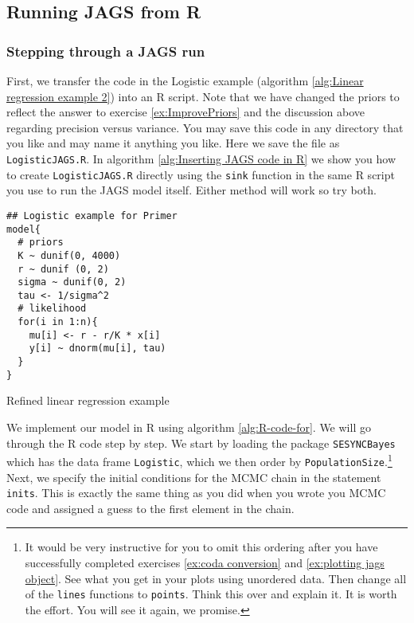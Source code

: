 \documentclass[12pt,english]{article}
\begin{document}
\subsection{Running JAGS from R}

\subsubsection{Stepping through a JAGS run} \label{sssec:Stepping through a JAGS run}

First, we transfer the code in the Logistic example (algorithm \ref{alg:Linear regression example 2}) into an R script. Note that we have changed the priors to reflect the answer to exercise \ref{ex:ImprovePriors} and the discussion above regarding precision versus variance. You may save this code in any directory that you like and may name it anything you like. Here we save the file as \texttt{LogisticJAGS.R}. In algorithm \ref{alg:Inserting JAGS code in R} we show you how to create \texttt{LogisticJAGS.R} directly using the \texttt{sink} function in the same R script you use to run the JAGS model itself. Either method will work so try both.

\begin{algorithm}
\begin{Verbatim}[frame=single]
## Logistic example for Primer
model{
  # priors
  K ~ dunif(0, 4000)
  r ~ dunif (0, 2)
  sigma ~ dunif(0, 2) 
  tau <- 1/sigma^2
  # likelihood
  for(i in 1:n){
    mu[i] <- r - r/K * x[i]
    y[i] ~ dnorm(mu[i], tau)
  }
}
\end{Verbatim}
\caption{Refined linear regression example}
\label{alg:Linear regression example 2}
\end{algorithm}

We implement our model in R using algorithm \ref{alg:R-code-for}. We will go through the R code step by step. We start by loading the package \texttt{SESYNCBayes} which has the data frame \texttt{Logistic}, which we then order by \texttt{PopulationSize}.\footnote{It would be very instructive for you to omit this ordering after you have successfully completed exercises \ref{ex:coda conversion} and \ref{ex:plotting jags object}. See what you get in your plots using unordered data. Then change all of the \texttt{lines} functions to \texttt{points}. Think this over and explain it. It is worth the effort. You will see it again, we promise.} Next, we specify the initial conditions for the MCMC chain in the statement \texttt{inits}. This is exactly the same thing as you did when you wrote you MCMC code and assigned a guess to the first element in the chain. 
\end{document}
